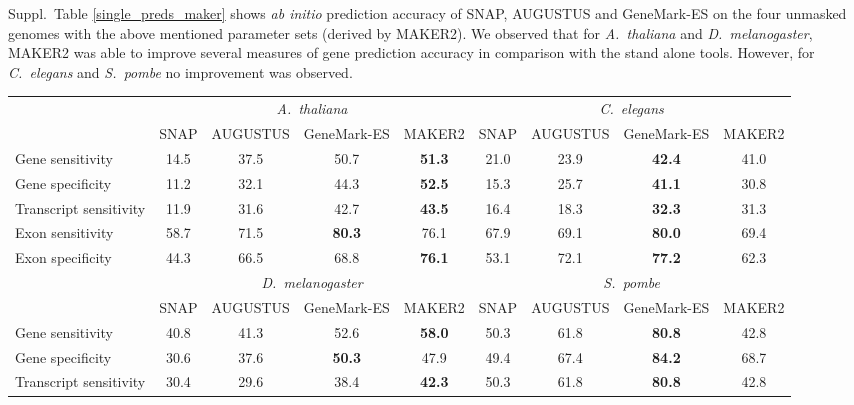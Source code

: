 \documentclass[a4paper,10pt]{report}
\begin{document}
Suppl.~Table \ref{single_preds_maker} shows \textit{ab initio} prediction accuracy of SNAP, AUGUSTUS and GeneMark-ES on the four unmasked genomes with the above mentioned parameter sets (derived by MAKER2). We observed that for \textit{A.~thaliana} and \textit{D.~melanogaster}, MAKER2 was able to improve several measures of gene prediction accuracy in comparison with the stand alone tools. However, for \textit{C.~elegans} and \textit{S.~pombe} no improvement was observed. 
\begin{table}
\begin{center}
 \begin{scriptsize}
 \begin{tabular}{|l|cccc|cccc|}
 \hline
& \multicolumn{4}{|c|}{\textit{A.~thaliana}} & \multicolumn{4}{|c|}{\textit{C.~elegans}}\\
& SNAP & AUGUSTUS & GeneMark-ES & MAKER2 & SNAP & AUGUSTUS & GeneMark-ES & MAKER2\\
\hline
Gene sensitivity        & 14.5 & 37.5 & 50.7 & \textbf{51.3} & 21.0 & 23.9 & \textbf{42.4} & 41.0\\
Gene specificity        & 11.2 & 32.1 & 44.3 & \textbf{52.5} & 15.3 & 25.7 & \textbf{41.1} & 30.8\\
Transcript sensitivity  & 11.9 & 31.6 & 42.7 & \textbf{43.5} & 16.4 & 18.3 & \textbf{32.3} & 31.3\\
Exon sensitivity        & 58.7 & 71.5 & \textbf{80.3} & 76.1 & 67.9 & 69.1 & \textbf{80.0} & 69.4\\
Exon specificity        & 44.3 & 66.5 & 68.8 & \textbf{76.1} & 53.1 & 72.1 & \textbf{77.2} & 62.3\\
\hline
& \multicolumn{4}{|c|}{\textit{D.~melanogaster}} & \multicolumn{4}{|c|}{\textit{S.~pombe}}\\
& SNAP & AUGUSTUS & GeneMark-ES & MAKER2 & SNAP & AUGUSTUS & GeneMark-ES & MAKER2\\
\hline
Gene sensitivity       & 40.8 & 41.3 & 52.6 & \textbf{58.0} & 50.3 & 61.8 & \textbf{80.8} & 42.8\\
Gene specificity       & 30.6 & 37.6 & \textbf{50.3} & 47.9 & 49.4 & 67.4 & \textbf{84.2} & 68.7\\
Transcript sensitivity & 30.4 & 29.6 & 38.4 & \textbf{42.3} & 50.3 & 61.8 & \textbf{80.8} & 42.8\\

\end{tabular}
\end{scriptsize}
\end{center}
\end{table}
\end{document}
